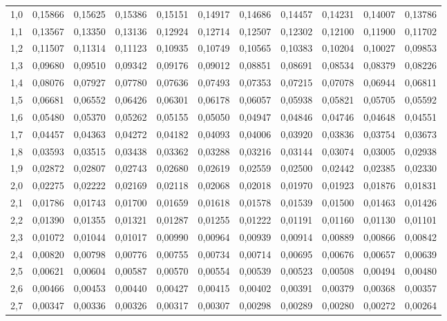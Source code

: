 \documentclass[a4paper]{article}
\begin{document}
\begin{center}
{\begin{tabular}{rrrrrrrrrrr}
  1,0 & 0,15866 & 0,15625 & 0,15386 & 0,15151 & 0,14917 & 0,14686 & 0,14457 & 0,14231 & 0,14007 & 0,13786 \\ 
  1,1 & 0,13567 & 0,13350 & 0,13136 & 0,12924 & 0,12714 & 0,12507 & 0,12302 & 0,12100 & 0,11900 & 0,11702 \\ 
  1,2 & 0,11507 & 0,11314 & 0,11123 & 0,10935 & 0,10749 & 0,10565 & 0,10383 & 0,10204 & 0,10027 & 0,09853 \\ 
  1,3 & 0,09680 & 0,09510 & 0,09342 & 0,09176 & 0,09012 & 0,08851 & 0,08691 & 0,08534 & 0,08379 & 0,08226 \\ 
  1,4 & 0,08076 & 0,07927 & 0,07780 & 0,07636 & 0,07493 & 0,07353 & 0,07215 & 0,07078 & 0,06944 & 0,06811 \\ 
  1,5 & 0,06681 & 0,06552 & 0,06426 & 0,06301 & 0,06178 & 0,06057 & 0,05938 & 0,05821 & 0,05705 & 0,05592 \\ 
  1,6 & 0,05480 & 0,05370 & 0,05262 & 0,05155 & 0,05050 & 0,04947 & 0,04846 & 0,04746 & 0,04648 & 0,04551 \\ 
  1,7 & 0,04457 & 0,04363 & 0,04272 & 0,04182 & 0,04093 & 0,04006 & 0,03920 & 0,03836 & 0,03754 & 0,03673 \\ 
  1,8 & 0,03593 & 0,03515 & 0,03438 & 0,03362 & 0,03288 & 0,03216 & 0,03144 & 0,03074 & 0,03005 & 0,02938 \\ 
  1,9 & 0,02872 & 0,02807 & 0,02743 & 0,02680 & 0,02619 & 0,02559 & 0,02500 & 0,02442 & 0,02385 & 0,02330 \\ 
  2,0 & 0,02275 & 0,02222 & 0,02169 & 0,02118 & 0,02068 & 0,02018 & 0,01970 & 0,01923 & 0,01876 & 0,01831 \\ 
  2,1 & 0,01786 & 0,01743 & 0,01700 & 0,01659 & 0,01618 & 0,01578 & 0,01539 & 0,01500 & 0,01463 & 0,01426 \\ 
  2,2 & 0,01390 & 0,01355 & 0,01321 & 0,01287 & 0,01255 & 0,01222 & 0,01191 & 0,01160 & 0,01130 & 0,01101 \\ 
  2,3 & 0,01072 & 0,01044 & 0,01017 & 0,00990 & 0,00964 & 0,00939 & 0,00914 & 0,00889 & 0,00866 & 0,00842 \\ 
  2,4 & 0,00820 & 0,00798 & 0,00776 & 0,00755 & 0,00734 & 0,00714 & 0,00695 & 0,00676 & 0,00657 & 0,00639 \\ 
  2,5 & 0,00621 & 0,00604 & 0,00587 & 0,00570 & 0,00554 & 0,00539 & 0,00523 & 0,00508 & 0,00494 & 0,00480 \\ 
  2,6 & 0,00466 & 0,00453 & 0,00440 & 0,00427 & 0,00415 & 0,00402 & 0,00391 & 0,00379 & 0,00368 & 0,00357 \\ 
  2,7 & 0,00347 & 0,00336 & 0,00326 & 0,00317 & 0,00307 & 0,00298 & 0,00289 & 0,00280 & 0,00272 & 0,00264 \\ 

\end{tabular}}
\end{center}
\end{document}
